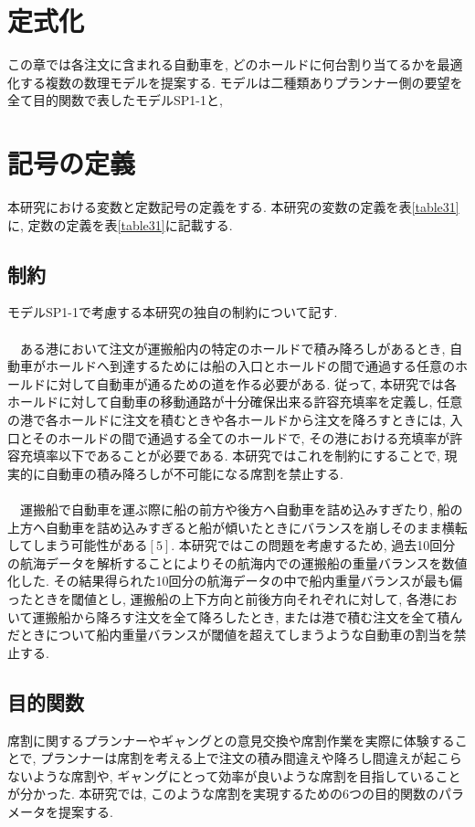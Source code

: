 \documentclass[a4j,11pt,twocolumn]{jsarticle}
\begin{document}
\section{定式化}
この章では各注文に含まれる自動車を, どのホールドに何台割り当てるかを最適化する複数の数理モデルを提案する. モデルは二種類ありプランナー側の要望を全て目的関数で表したモデルSP1-1と,
\section{記号の定義}
本研究における変数と定数記号の定義をする. 本研究の変数の定義を表\ref{table31}に, 定数の定義を表\ref{table31}に記載する. \\


\subsection{制約}
モデルSP1-1で考慮する本研究の独自の制約について記す.  \\

 \\
　ある港において注文が運搬船内の特定のホールドで積み降ろしがあるとき, 自動車がホールドへ到達するためには船の入口とホールドの間で通過する任意のホールドに対して自動車が通るための道を作る必要がある. 従って, 本研究では各ホールドに対して自動車の移動通路が十分確保出来る許容充填率を定義し, 任意の港で各ホールドに注文を積むときや各ホールドから注文を降ろすときには, 入口とそのホールドの間で通過する全てのホールドで, その港における充填率が許容充填率以下であることが必要である. 本研究ではこれを制約にすることで, 現実的に自動車の積み降ろしが不可能になる席割を禁止する. \\

 \\
　運搬船で自動車を運ぶ際に船の前方や後方へ自動車を詰め込みすぎたり, 船の上方へ自動車を詰め込みすぎると船が傾いたときにバランスを崩しそのまま横転してしまう可能性がある$[5]$. 本研究ではこの問題を考慮するため, 過去10回分の航海データを解析することによりその航海内での運搬船の重量バランスを数値化した. その結果得られた10回分の航海データの中で船内重量バランスが最も偏ったときを閾値とし, 運搬船の上下方向と前後方向それぞれに対して, 各港において運搬船から降ろす注文を全て降ろしたとき, または港で積む注文を全て積んだときについて船内重量バランスが閾値を超えてしまうような自動車の割当を禁止する.

\subsection{目的関数}
席割に関するプランナーやギャングとの意見交換や席割作業を実際に体験することで, プランナーは席割を考える上で注文の積み間違えや降ろし間違えが起こらないような席割や, ギャングにとって効率が良いような席割を目指していることが分かった. 本研究では, このような席割を実現するための6つの目的関数のパラメータを提案する. \\
\end{document}
